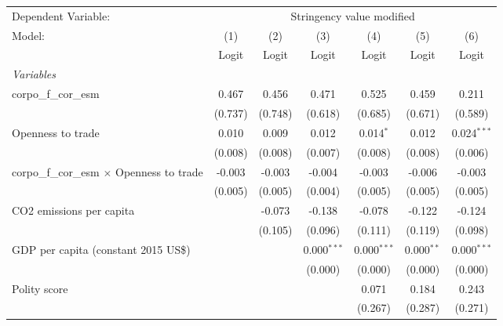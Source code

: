 
\begingroup
\centering
\begin{tabular}{lcccccc}
   \toprule
   Dependent Variable: & \multicolumn{6}{c}{Stringency value modified}\\
   Model:                                            & (1)     & (2)     & (3)           & (4)           & (5)          & (6)\\  
                                                     &  Logit  & Logit   & Logit         & Logit         & Logit        & Logit\\  
   \midrule
   \emph{Variables}\\
   corpo\_f\_cor\_esm                                & 0.467   & 0.456   & 0.471         & 0.525         & 0.459        & 0.211\\   
                                                     & (0.737) & (0.748) & (0.618)       & (0.685)       & (0.671)      & (0.589)\\   
   Openness to trade                                 & 0.010   & 0.009   & 0.012         & 0.014$^{*}$   & 0.012        & 0.024$^{***}$\\   
                                                     & (0.008) & (0.008) & (0.007)       & (0.008)       & (0.008)      & (0.006)\\   
   corpo\_f\_cor\_esm $\times$ Openness to trade     & -0.003  & -0.003  & -0.004        & -0.003        & -0.006       & -0.003\\   
                                                     & (0.005) & (0.005) & (0.004)       & (0.005)       & (0.005)      & (0.005)\\   
   CO2 emissions per capita                          &         & -0.073  & -0.138        & -0.078        & -0.122       & -0.124\\   
                                                     &         & (0.105) & (0.096)       & (0.111)       & (0.119)      & (0.098)\\   
   GDP per capita (constant 2015 US\$)               &         &         & 0.000$^{***}$ & 0.000$^{***}$ & 0.000$^{**}$ & 0.000$^{***}$\\   
                                                     &         &         & (0.000)       & (0.000)       & (0.000)      & (0.000)\\   
   Polity score                                      &         &         &               & 0.071         & 0.184        & 0.243\\   
                                                     &         &         &               & (0.267)       & (0.287)      & (0.271)\\   

\end{tabular}
